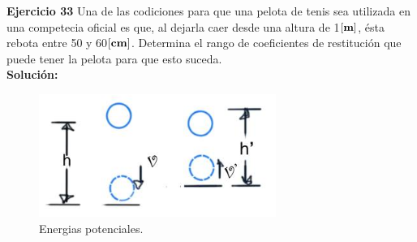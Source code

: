 \documentclass[a4paper,11pt]{scrartcl}
\begin{document}
\textbf{Ejercicio 33} Una de las codiciones para que una pelota de tenis sea utilizada en una competecia oficial es que, al dejarla caer desde una altura de 1${\bf [m]}$, ésta rebota entre 50 y 60${\bf [cm]}$. Determina el rango de coeficientes de restitución que puede tener la pelota para que esto suceda. \\

\textbf{Solución:}

\begin{figure}[H]
  \centering
  \includegraphics[height=4cm]{33_1}
  \caption{Energias potenciales.}
  \label{fig:33_1}
\end{figure}
\end{document}
